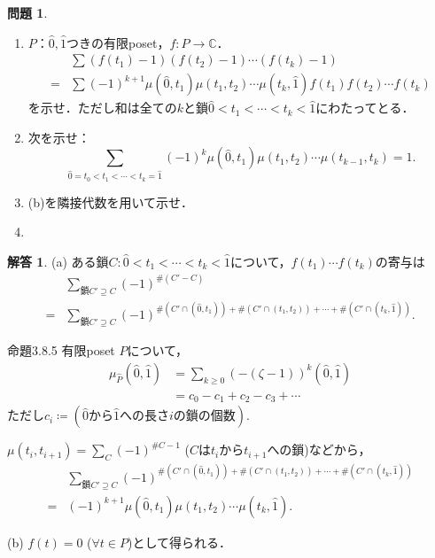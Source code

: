 \documentclass[xelatex,ja=standard,a4paper,14pt,everyparhook=compat]{bxjsarticle}
\newcommand{\bbC}{\mathbb{C}}
\theoremstyle{definition}
\newtheorem{problem}{問題}
\newtheorem*{answer}{解答}
\begin{document}
\begin{problem}
\begin{enumerate}
    \item $P$：$\hat0,\hat1$つきの有限poset，$f: P \to \bbC$．
          \begin{align*}
                  & \sum (f(t_1)-1) (f(t_2)-1) \cdots (f(t_k)-1)                                                   \\
              ={} & \sum (-1)^{k+1} \mu(\hat0, t_1) \mu(t_1,t_2) \cdots \mu(t_k,\hat1) f(t_1) f(t_2) \cdots f(t_k)
          \end{align*}
          を示せ．ただし和は全ての$k$と鎖$\hat 0 < t_1 < \cdots < t_k < \hat 1$にわたってとる．
    \item 次を示せ： \begin{equation*}
              \sum_{\hat0 = t_0 < t_1 < \cdots < t_k = \hat1} (-1)^k \mu(\hat0, t_1) \mu(t_1,t_2) \cdots \mu(t_{k-1},t_k) = 1.
          \end{equation*}
          \item (b)を隣接代数を用いて示せ．
          \item
\end{enumerate}
\end{problem}

\begin{answer}
    (a) ある鎖$C: \hat0 < t_1 < \cdots < t_k < \hat1$について，$f(t_1)\cdots f(t_k)$の寄与は \begin{align*}
            & \sum_{\text{鎖$C'$} \supseteq C} (-1)^{\#(C'-C)}                                                                            \\
        ={} & \sum_{\text{鎖$C'$} \supseteq C} (-1)^{\#(C' \cap (\hat0,t_1)) + \#(C' \cap (t_1,t_2)) + \cdots + \#(C' \cap (t_k,\hat1))}.
    \end{align*}
    \begin{itembox}[l]{命題3.8.5}
        有限poset $P$について，
        \begin{align*}
            \mu_{\widehat P}(\hat0, \hat1)
             & = \sum_{k \geq 0} (-(\zeta-1))^k (\hat0,\hat1) \\
             & = c_0 - c_1 + c_2 - c_3 + \cdots
        \end{align*}
        ただし$c_i \coloneqq (\text{$\hat0$から$\hat1$への長さ$i$の鎖の個数})$.
    \end{itembox}
    $\mu(t_i, t_{i+1}) = \sum_{C} (-1)^{\#C-1}$ ($C$は$t_i$から$t_{i+1}$への鎖)などから， \begin{align*}
            & \sum_{\text{鎖$C'$} \supseteq C} (-1)^{\#(C' \cap (\hat0,t_1)) + \#(C' \cap (t_1,t_2)) + \cdots + \#(C' \cap (t_k,\hat1))} \\
        ={} & (-1)^{k+1} \mu(\hat0, t_1) \mu(t_1,t_2) \cdots \mu(t_k,\hat1).
    \end{align*}

    (b) $f(t) = 0$ ($\forall t \in P$)として得られる．
\end{answer}
\end{document}
